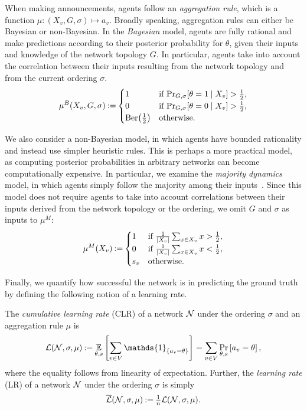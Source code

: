 When making announcements, agents follow an \emph{aggregation rule}, which is a function $ \mu:  ( X_v, G, \sigma ) \mapsto a_v $.
Broadly speaking, aggregation rules can either be Bayesian or non-Bayesian. 
In the \emph{Bayesian} model,  agents are fully rational
and make predictions according to their posterior probability for $\theta$, given their inputs and knowledge of the network topology $G$. In particular, agents take into account the correlation between their inputs resulting from the network topology and from the current ordering $ \sigma $. \[
     \mu^B(X_v, G, \sigma) \mathbin{:=} \begin{cases}
         1 & \text{if $\Pr_{G,\sigma}[\theta = 1 \;\vert\; X_v] > \frac 12$,} \\
         0 & \text{if $\Pr_{G,\sigma}[\theta = 0 \;\vert\; X_v] > \frac 12$,} \\
         \operatorname{Ber}\!\left(\frac 12\right) & \text{otherwise.}
     \end{cases}
 \]

We also consider a non-Bayesian model, in which agents have bounded rationality and instead use simpler heuristic rules.
This is perhaps a more practical model, as computing posterior probabilities in arbitrary networks can become computationally expensive. 
In particular, we examine the \emph{majority dynamics} model, in which agents simply follow the majority among their inputs~\cite{Bahar2020-am,Shoham1992-ir,Laland2004-ej}. Since this model does not require agents to take into account correlations between their inputs derived from the network topology or the ordering, we omit $G$ and $ \sigma $ as inputs to $\mu^M$: \[
    \mu^M(X_v) \mathbin{:=} \begin{cases}
        1 & \text{if $  \frac 1{\left\lvert X_v \right\rvert}\sum_{x \in X_v} x > \frac 12 $,} \\
        0 & \text{if $  \frac 1{\left\lvert X_v \right\rvert}\sum_{x \in X_v} x < \frac 12 $,} \\
        s_v & \text{otherwise.}
    \end{cases}
\]

Finally, we quantify how successful the network is in predicting the ground truth by defining the following notion of a learning rate.
\begin{definition}
    The \emph{cumulative learning rate} (CLR) of a network $ \mathcal{N} $ under the ordering $ \sigma $ and an aggregation rule $ \mu $ is \[
		\clr (\network, \sigma, \mu) \deq \E_{\theta, s} \left[ \sum_{v \in V}^{} \mathds{1}_{\{a_v = \theta\}} \right] = \sum_{v \in V} \Pr_{\theta, s}\left[a_v = \theta\right],
	\]
    where the equality follows from linearity of expectation.
    Further, the \emph{learning rate} (LR) of a network $ \mathcal{N} $ under the ordering $ \sigma $ is simply \[
		\overline{\mathcal{L}} (\mathcal{N}, \sigma, \mu) \mathbin{:=} \tfrac 1 n \mathcal{L} (\mathcal{N}, \sigma, \mu).
	\]
\end{definition}

